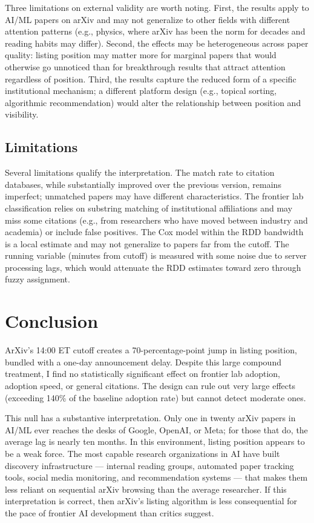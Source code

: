 \documentclass[12pt]{article}
\begin{document}
Three limitations on external validity are worth noting. First, the results apply to AI/ML papers on arXiv and may not generalize to other fields with different attention patterns (e.g., physics, where arXiv has been the norm for decades and reading habits may differ). Second, the effects may be heterogeneous across paper quality: listing position may matter more for marginal papers that would otherwise go unnoticed than for breakthrough results that attract attention regardless of position. Third, the results capture the reduced form of a specific institutional mechanism; a different platform design (e.g., topical sorting, algorithmic recommendation) would alter the relationship between position and visibility.

\subsection{Limitations}

Several limitations qualify the interpretation. The match rate to citation databases, while substantially improved over the previous version, remains imperfect; unmatched papers may have different characteristics. The frontier lab classification relies on substring matching of institutional affiliations and may miss some citations (e.g., from researchers who have moved between industry and academia) or include false positives. The Cox model within the RDD bandwidth is a local estimate and may not generalize to papers far from the cutoff. The running variable (minutes from cutoff) is measured with some noise due to server processing lags, which would attenuate the RDD estimates toward zero through fuzzy assignment.


\section{Conclusion}

ArXiv's 14:00 ET cutoff creates a 70-percentage-point jump in listing position, bundled with a one-day announcement delay. Despite this large compound treatment, I find no statistically significant effect on frontier lab adoption, adoption speed, or general citations. The design can rule out very large effects (exceeding 140\% of the baseline adoption rate) but cannot detect moderate ones.

This null has a substantive interpretation. Only one in twenty arXiv papers in AI/ML ever reaches the desks of Google, OpenAI, or Meta; for those that do, the average lag is nearly ten months. In this environment, listing position appears to be a weak force. The most capable research organizations in AI have built discovery infrastructure --- internal reading groups, automated paper tracking tools, social media monitoring, and recommendation systems --- that makes them less reliant on sequential arXiv browsing than the average researcher. If this interpretation is correct, then arXiv's listing algorithm is less consequential for the pace of frontier AI development than critics suggest.
\end{document}
